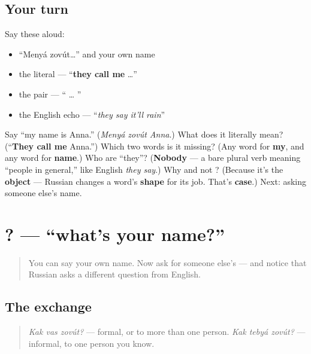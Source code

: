 \subsection*{Your turn}
Say these aloud:

\begin{itemize}
\raggedright
  \item \textquotedblleft{}Menyá zovút…\textquotedblright{} and your own name
  \item the literal — \textquotedblleft{}\textbf{they call me} …\textquotedblright{}
  \item the pair — \textquotedblleft{}\textbf{} … \textbf{}\textquotedblright{}
  \item the English echo — \textquotedblleft{}\emph{they say it'll rain}\textquotedblright{}
\end{itemize}

\begin{tcolorbox}[breakable,colback=teal!4,colframe=teal!35!black,title={Before you move on}]
Say \textquotedblleft{}my name is Anna.\textquotedblright{} (\emph{Menyá zovút Anna}.) What does it literally mean? (\textquotedblleft{}\textbf{They call me} Anna.\textquotedblright{}) Which two words is it missing? (Any word for \textbf{my}, and any word for \textbf{name}.) Who are \textquotedblleft{}they\textquotedblright{}? (\textbf{Nobody} — a bare plural verb meaning \textquotedblleft{}people in general,\textquotedblright{} like English \emph{they say}.) Why \emph{} and not \emph{}? (Because it's the \textbf{object} — Russian changes a word's \textbf{shape} for its job. That's \textbf{case}.) Next: asking someone else's name.
\end{tcolorbox}
\section[\texorpdfstring{\ru{как} \ru{вас} \ru{зовут}? (kak vas zovút)}{как вас зовут? (kak vas zovút)}]{  ? — \textquotedblleft{}what's your name?\textquotedblright{}}

\label{lesson:RU-C02-kak-vas-zovut}



\begin{quote}
You can say your own name. Now ask for someone else's — and notice that Russian asks a different question from English.
\end{quote}

\subsection*{The exchange}
\begin{quote}
\emph{Kak vas zovút?} — formal, or to more than one person. \emph{Kak tebyá zovút?} — informal, to one person you know.
\end{quote}

